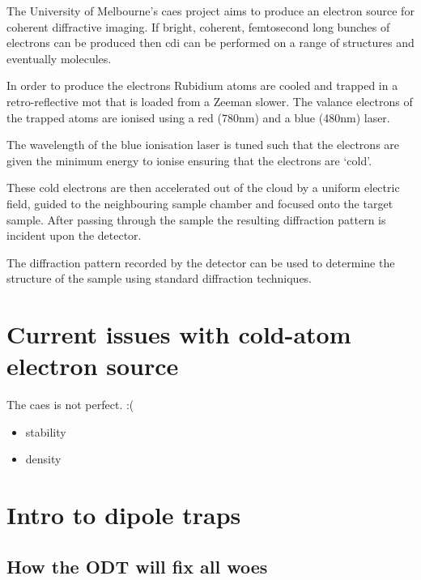 The University of Melbourne's \gls{caes} project aims to produce an electron source for coherent diffractive imaging. If bright, coherent, femtosecond long bunches of electrons can be produced then \gls{cdi} can be performed on a range of structures and eventually molecules.

In order to produce the electrons Rubidium atoms are cooled and trapped in a retro-reflective \gls{mot} that is loaded from a Zeeman slower\cite{phillips_laser_1982, phillips_cooling_1987, bell_slow_2010}. The valance electrons of the trapped atoms are ionised using a red (780nm) and a blue (480nm) laser.

The wavelength of the blue ionisation laser is tuned such that the electrons are given the minimum energy to ionise ensuring that the electrons are `cold'.

These cold electrons are then accelerated out of the cloud by a uniform electric field, guided to the neighbouring sample chamber and focused onto the target sample. After passing through the sample the resulting diffraction pattern is incident upon the detector.

The diffraction pattern recorded by the detector can be used to determine the structure of the sample using standard diffraction techniques.

\section{Current issues with cold-atom electron source}

The \gls{caes} is not perfect. :(

\begin{itemize}
    \item stability
    \item density
\end{itemize}

\section{Intro to dipole traps}

    \subsection{How the ODT will fix all woes}


